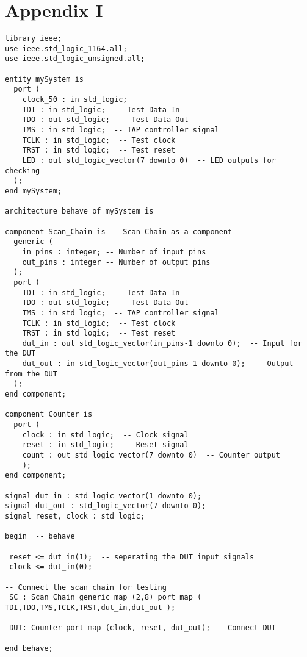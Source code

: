 \documentclass[a4paper,11pt]{article}
\begin{document}
\section*{Appendix I}
\begin{verbatim}
library ieee;
use ieee.std_logic_1164.all;
use ieee.std_logic_unsigned.all;

entity mySystem is
  port (
    clock_50 : in std_logic;
    TDI : in std_logic;  -- Test Data In
    TDO : out std_logic;  -- Test Data Out
    TMS : in std_logic;  -- TAP controller signal
    TCLK : in std_logic;  -- Test clock
    TRST : in std_logic;  -- Test reset
    LED : out std_logic_vector(7 downto 0)  -- LED outputs for checking
  );
end mySystem;

architecture behave of mySystem is

component Scan_Chain is	-- Scan Chain as a component
  generic (
    in_pins : integer; -- Number of input pins
    out_pins : integer -- Number of output pins
  );
  port (
    TDI : in std_logic;  -- Test Data In
    TDO : out std_logic;  -- Test Data Out
    TMS : in std_logic;  -- TAP controller signal
    TCLK : in std_logic;  -- Test clock
    TRST : in std_logic;  -- Test reset
    dut_in : out std_logic_vector(in_pins-1 downto 0);  -- Input for the DUT
    dut_out : in std_logic_vector(out_pins-1 downto 0);  -- Output from the DUT
  );
end component;

component Counter is
  port (
    clock : in std_logic;  -- Clock signal
    reset : in std_logic;  -- Reset signal
    count : out std_logic_vector(7 downto 0)  -- Counter output
    );
end component;

signal dut_in : std_logic_vector(1 downto 0);
signal dut_out : std_logic_vector(7 downto 0);
signal reset, clock : std_logic;

begin  -- behave

 reset <= dut_in(1);  -- seperating the DUT input signals
 clock <= dut_in(0);

-- Connect the scan chain for testing 
 SC : Scan_Chain generic map (2,8) port map ( TDI,TDO,TMS,TCLK,TRST,dut_in,dut_out );

 DUT: Counter port map (clock, reset, dut_out); -- Connect DUT
  
end behave;
\end{verbatim}
\end{document}
